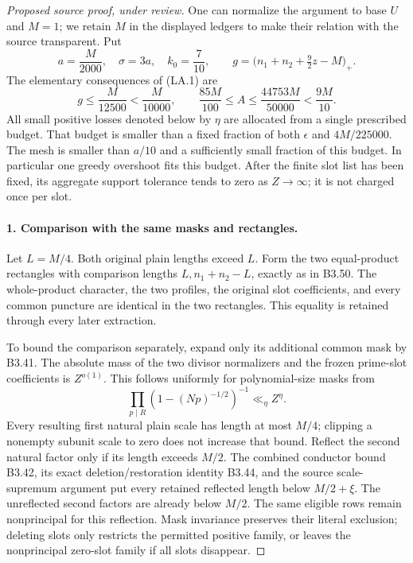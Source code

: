\begin{proof}[Proposed source proof, under review]
One can normalize the argument to base $U$ and $M=1$; we retain $M$ in
the displayed ledgers to make their relation with the source transparent.
Put
\[
 a=\frac{M}{2000},\quad \sigma=3a,\quad k_0=\frac7{10},\qquad
 g=\bigl(n_1+n_2+\tfrac92z-M\bigr)_+.
\]
The elementary consequences of (LA.1) are
\[
 g\le\frac M{12500}<\frac M{10000},\qquad
 \frac{85M}{100}\le A\le\frac{44753M}{50000}<\frac{9M}{10}.
 \tag{LA.3}
\]
All small positive losses denoted below by $\eta$ are allocated from a
single prescribed budget. That budget is smaller than a fixed fraction
of both $\epsilon$ and $4M/225000$. The mesh is smaller than $a/10$
and a sufficiently small fraction of this budget. In particular one
greedy overshoot fits this budget. After the finite slot list has been
fixed, its aggregate support tolerance tends to zero as $Z\to\infty$;
it is not charged once per slot.

\paragraph{1. Comparison with the same masks and rectangles.}
Let $L=M/4$. Both original plain lengths exceed $L$. Form the two
equal-product rectangles with comparison lengths
$L,n_1+n_2-L$, exactly as in B3.50. The whole-product character,
the two profiles, the original slot coefficients, and every common
puncture are identical in the two rectangles. This equality is
retained through every later extraction.

To bound the comparison separately, expand only its additional common
mask by B3.41. The absolute mass of the two divisor normalizers and
the frozen prime-slot coefficients is $Z^{o(1)}$. This follows uniformly
for polynomial-size masks from
\[
 \prod_{p\mid R}(1-(Np)^{-1/2})^{-1}\ll_\eta Z^\eta.
\]
Every resulting first natural plain scale has length at most $M/4$;
clipping a nonempty subunit scale to zero does not increase that bound.
Reflect the second natural factor only if its length exceeds $M/2$.
The combined conductor bound B3.42, its exact deletion/restoration
identity B3.44, and the source scale-supremum argument put every retained
reflected length below $M/2+\xi$. The unreflected second factors are
already below $M/2$. The same eligible rows remain nonprincipal for
this reflection. Mask invariance preserves their literal exclusion;
deleting slots only restricts the permitted positive family, or leaves
the nonprincipal zero-slot family if all slots disappear.


\end{proof}
